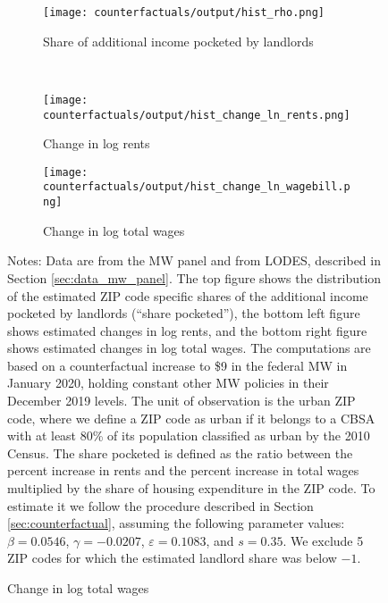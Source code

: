 \begin{figure}[h!]
    \centering
    \caption{Distributions of estimated shares pocketed by landlords under a 
            counterfactual federal MW policy of \$9, urban ZIP codes}
    \label{fig:cf_hist_rents_wages_shares}

    \begin{subfigure}{0.65\textwidth}
        \caption*{Share of additional income pocketed by landlords}
        \texttt{[image: counterfactuals/output/hist\_rho.png]}
    \end{subfigure}\\
    \begin{subfigure}{0.5\textwidth}
        \caption*{Change in log rents}
        \texttt{[image: counterfactuals/output/hist\_change\_ln\_rents.png]}
    \end{subfigure}%
    \begin{subfigure}{0.5\textwidth}
        \caption*{Change in log total wages}
        \texttt{[image: counterfactuals/output/hist\_change\_ln\_wagebill.png]}
    \end{subfigure}

    \begin{minipage}{.95\textwidth} \footnotesize
        \vspace{3mm}
        Notes:
        Data are from the MW panel and from LODES, described in
        Section \ref{sec:data_mw_panel}.
        The top figure shows the distribution of the estimated ZIP code specific
        shares of the additional income pocketed by landlords (``share pocketed''), 
        the bottom left figure shows estimated changes in log rents, and 
        the bottom right figure shows estimated changes in log total wages.
        The computations are based on a counterfactual increase to \$9 in the 
        federal MW in January 2020, holding constant other MW policies in their 
        December 2019 levels.
        The unit of observation is the urban ZIP code, where we define a ZIP code 
        as urban if it belongs to a CBSA with at least 80\% of its population 
        classified as urban by the 2010 Census.
        The share pocketed is defined as the ratio between the percent increase 
        in rents and the percent increase in total wages multiplied by the share 
        of housing expenditure in the ZIP code.
        To estimate it we follow the procedure described in Section 
        \ref{sec:counterfactual}, assuming the following parameter values: 
        $\beta = 0.0546$, $\gamma = -0.0207$, $\varepsilon = 0.1083$, and 
        $s = 0.35$.
        We exclude 5 ZIP codes for which the estimated landlord share was 
        below $-1$.
    \end{minipage}
\end{figure}
